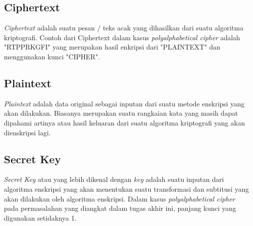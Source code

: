 	\subsection{Ciphertext}
	\textit{Ciphertext} adalah suatu pesan / teks acak yang dihasilkan dari suatu algoritma kriptografi. 
	Contoh dari Ciphertext dalam kasus \textit{polyalphabetical cipher} adalah "RTPPRKGFI" yang merupakan hasil enkripsi dari "PLAINTEXT" dan menggunakan kunci "CIPHER"\cite{william_crytography_2011}.
	
	\subsection{Plaintext}
	\textit{Plaintext} adalah data original sebagai inputan dari suatu metode enskripsi yang akan dilakukan\cite{william_crytography_2011}. Biasanya merupakan suatu rangkaian kata yang masih dapat dipahami artinya atau hasil keluaran dari suatu algoritma kriptografi yang akan dienskripsi lagi.
	
	\subsection{Secret Key}
	\textit{Secret Key} atau yang lebih dikenal dengan \textit{key} adalah suatu inputan dari algoritma enskripsi yang akan menentukan suatu transformasi dan subtitusi yang akan dilakukan oleh algoritma enskripsi\cite{william_crytography_2011}. Dalam kasus \textit{polyalphabetical cipher} pada permasalahan yang diangkat dalam tugas akhir ini, panjang kunci yang digunakan setidaknya 1. 
	
